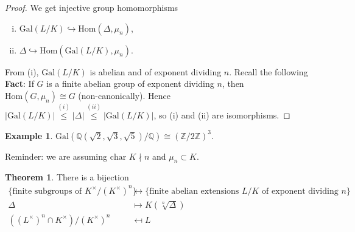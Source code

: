 \documentclass{article}
\theoremstyle{definition}
\newtheorem{theorem}{Theorem}[section]
\newtheorem{example}{Example}[section]
\begin{document}
\begin{proof}
    We get injective group homomorphisms
    \begin{enumerate}[(i)]
        \item $\text{Gal}(L/K) \hookrightarrow \text{Hom}(\Delta,\mu_n)$,
        \item $\Delta \hookrightarrow \text{Hom}(\text{Gal}(L/K),\mu_n)$.
    \end{enumerate}
    From (i), $\text{Gal}(L/K)$ is abelian and of exponent dividing $n$. Recall the following \textbf{Fact}: If $G$ is a finite abelian group of exponent dividing $n$, then $\text{Hom}(G,\mu_n)\cong G$ (non-canonically). Hence $\left|\text{Gal}(L/K)\right|\stackrel{(i)}{\le } \left|\Delta\right| \stackrel{(ii)}{\le } \left|\text{Gal}(L/K)\right|$, so (i) and (ii) are isomorphisms.
\end{proof}
\begin{example}
    $\text{Gal}(\mathbb{Q}(\sqrt{2},\sqrt{3},\sqrt{5})/\mathbb{Q}) \cong (\mathbb{Z}/2\mathbb{Z})^3$.
\end{example}
Reminder: we are assuming $\text{char }K \nmid n$ and $\mu_n \subset K$.
\begin{theorem}\label{theorem11.2}
    There is a bijection 
    \begin{align*}
        \{\text{finite subgroups of }K^\times/(K^\times)^n\} &\leftrightarrow \{\text{finite abelian extensions }L/K \text{ of exponent dividing }n\}\\
        \Delta &\mapsto K(\sqrt[n]{\Delta})\\
        ((L^\times)^n \cap K^\times)/(K^\times)^n &\mapsfrom L
    \end{align*}
\end{theorem}
\end{document}

